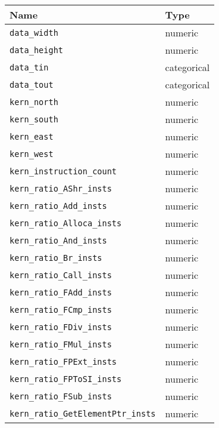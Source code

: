 \begin{tabular}{ll}
\toprule
                                           Name &         Type \\
\midrule
                           \texttt{data\_width} &      numeric \\
                          \texttt{data\_height} &      numeric \\
                             \texttt{data\_tin} &  categorical \\
                            \texttt{data\_tout} &  categorical \\
                           \texttt{kern\_north} &      numeric \\
                           \texttt{kern\_south} &      numeric \\
                            \texttt{kern\_east} &      numeric \\
                            \texttt{kern\_west} &      numeric \\
              \texttt{kern\_instruction\_count} &      numeric \\
              \texttt{kern\_ratio\_AShr\_insts} &      numeric \\
               \texttt{kern\_ratio\_Add\_insts} &      numeric \\
            \texttt{kern\_ratio\_Alloca\_insts} &      numeric \\
               \texttt{kern\_ratio\_And\_insts} &      numeric \\
                \texttt{kern\_ratio\_Br\_insts} &      numeric \\
              \texttt{kern\_ratio\_Call\_insts} &      numeric \\
              \texttt{kern\_ratio\_FAdd\_insts} &      numeric \\
              \texttt{kern\_ratio\_FCmp\_insts} &      numeric \\
              \texttt{kern\_ratio\_FDiv\_insts} &      numeric \\
              \texttt{kern\_ratio\_FMul\_insts} &      numeric \\
             \texttt{kern\_ratio\_FPExt\_insts} &      numeric \\
            \texttt{kern\_ratio\_FPToSI\_insts} &      numeric \\
              \texttt{kern\_ratio\_FSub\_insts} &      numeric \\
     \texttt{kern\_ratio\_GetElementPtr\_insts} &      numeric \\

\end{tabular}
